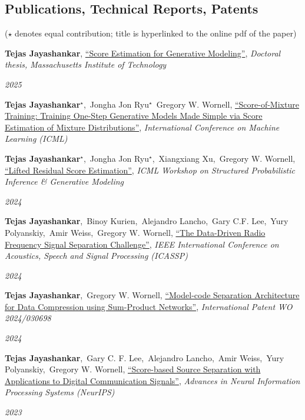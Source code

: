 \documentclass[10pt,margin,centered]{res}
\newcommand\quelle[1]{{%
      \unskip\nobreak\hfil\penalty50
      \hbox{}\nobreak\hfil\emph{#1}%
      \parfillskip=0pt \finalhyphendemerits=0 \par}}
\newcommand{\ptitle}[1]{``#1''}
\begin{document}
\begin{resume}
\section{\sc Publications, Technical Reports, Patents}
{\footnotesize{($\star$ denotes equal contribution; title is hyperlinked to the online pdf of the paper)}}
\begin{enumerate}[label={\arabic*.},leftmargin=*]
  \item \textbf{Tejas Jayashankar}, \href{https://dspace.mit.edu/handle/1721.1/164063}{``Score Estimation for Generative Modeling''}, \textit{Doctoral thesis, Massachusetts Institute of Technology}\quelle{2025}
  \item \textbf{Tejas Jayashankar}$^\star$,\, Jongha Jon Ryu$^\star$\, Gregory W. Wornell, \href{https://arxiv.org/abs/2502.09609}{\ptitle{Score-of-Mixture Training: Training One-Step Generative Models Made Simple via Score Estimation of Mixture Distributions}}, \textit{International Conference on Machine Learning (ICML)} \,\,{\color{black}\quelle{2025}
  \item \textbf{Tejas Jayashankar}$^\star$,\, Jongha Jon Ryu$^\star$,\, Xiangxiang Xu,\, Gregory W. Wornell, \href{https://openreview.net/pdf?id=zX27NDlfcu}{\ptitle{Lifted Residual Score Estimation}}, \textit{ICML Workshop on Structured Probabilistic Inference \& Generative Modeling} \quelle{2024}
  \item \textbf{Tejas Jayashankar},\, Binoy Kurien,\, Alejandro Lancho,\, Gary C.F. Lee,\, Yury Polyanskiy,\, Amir Weiss,\, Gregory W. Wornell, \href{https://ieeexplore.ieee.org/document/10627554}{\ptitle{The Data-Driven Radio Frequency Signal Separation Challenge}}, \textit{IEEE International Conference on Acoustics, Speech and Signal Processing (ICASSP)} \quelle{2024}
  \item \textbf{Tejas Jayashankar},\, Gregory W. Wornell, \href{https://patents.google.com/patent/WO2024030698A1/en?oq=WO+2024%2f030698}{\ptitle{Model-code Separation Architecture for Data Compression using Sum-Product Networks}}, {\color{blue}\textit{International Patent WO 2024/030698}}\quelle{2024}
  \item \textbf{Tejas Jayashankar},\, Gary C. F. Lee,\, Alejandro Lancho,\, Amir Weiss,\, Yury Polyanskiy,\, Gregory W. Wornell, \href{https://openreview.net/pdf?id=BFGQQKicuu}{\ptitle{Score-based Source Separation with Applications to Digital Communication Signals}}, \textit{Advances in Neural Information Processing Systems (NeurIPS)} \quelle{2023}
}
\end{enumerate}
\end{resume}
\end{document}
